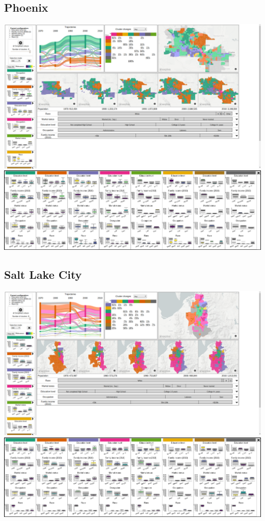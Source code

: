 \documentclass[a4paper]{article}
\begin{document}
\subsection{Phoenix}
\begin{center}
	\includegraphics[width=\linewidth]{33a.png}
	\includegraphics[width=\linewidth]{33b.png}
\end{center} \clearpage



\subsection{Salt Lake City}
\begin{center}
	\includegraphics[width=\linewidth]{34a.png}
	\includegraphics[width=\linewidth]{34b.png}
\end{center} \clearpage
\end{document}
